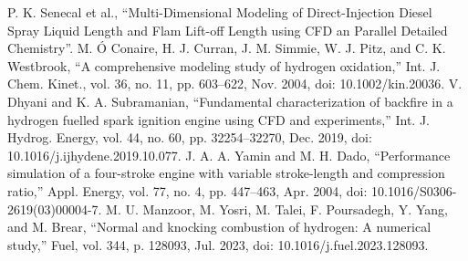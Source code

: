 \documentclass[conference]{IEEEtran}
\begin{document}
\begin{thebibliography}{00}
 P. K. Senecal et al., “Multi-Dimensional Modeling of Direct-Injection Diesel Spray Liquid Length and Flam Lift-off Length using CFD an Parallel Detailed Chemistry”.
 M. Ó Conaire, H. J. Curran, J. M. Simmie, W. J. Pitz, and C. K. Westbrook, “A comprehensive modeling study of hydrogen oxidation,” Int. J. Chem. Kinet., vol. 36, no. 11, pp. 603–622, Nov. 2004, doi: 10.1002/kin.20036.
 V. Dhyani and K. A. Subramanian, “Fundamental characterization of backfire in a hydrogen fuelled spark ignition engine using CFD and experiments,” Int. J. Hydrog. Energy, vol. 44, no. 60, pp. 32254–32270, Dec. 2019, doi: 10.1016/j.ijhydene.2019.10.077.
 J. A. A. Yamin and M. H. Dado, “Performance simulation of a four-stroke engine with variable stroke-length and compression ratio,” Appl. Energy, vol. 77, no. 4, pp. 447–463, Apr. 2004, doi: 10.1016/S0306-2619(03)00004-7.
 M. U. Manzoor, M. Yosri, M. Talei, F. Poursadegh, Y. Yang, and M. Brear, “Normal and knocking combustion of hydrogen: A numerical study,” Fuel, vol. 344, p. 128093, Jul. 2023, doi: 10.1016/j.fuel.2023.128093.


\end{thebibliography}
\end{document}
